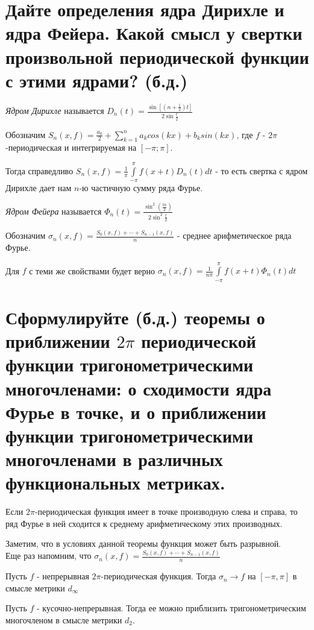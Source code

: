 \documentclass{article}
\begin{document}
	\section{Дайте определения ядра Дирихле и ядра Фейера. Какой смысл у свертки произвольной периодической функции с этими ядрами? (б.д.)}
	
	\begin{definition}
		\textit{Ядром Дирихле} называется $D_n(t)=\frac{\sin[(n+\frac{1}{2})t]}{2\sin{\frac{t}{2}}}$
	\end{definition}

	Обозначим $S_n(x,f)=\frac{a_0}{2} + \sum_{k=1}^{n} a_k cos(kx) + b_k sin(kx)$, где $f$ - $2\pi$-периодическая и интегрируемая на $[-\pi; \pi]$. 
	
	Тогда справедливо $S_n(x, f)=\frac{1}{\pi}\int\limits_{-\pi}^{\pi}f(x+t)D_n(t) dt$ - то есть свертка с ядром Дирихле дает нам $n$-ю частичную сумму ряда Фурье.

	\begin{definition}
		\textit{Ядром Фейера} называется $\Phi_n(t)=\frac{\sin^2(\frac{tn}{2})}{2\sin^2{\frac{t}{2}}}$
	\end{definition}

	Обозначим $\sigma_n(x,f)=\frac{S_0(x, f)+\cdots+S_{n-1}(x, f)}{n}$ - среднее арифметическое ряда Фурье. 
	
	Для $f$ с теми же свойствами будет верно $\sigma_n(x, f)=\frac{1}{n\pi}\int\limits_{-\pi}^{\pi}f(x+t)\Phi_n(t) dt$
	 
	\section{Сформулируйте (б.д.) теоремы о приближении $2\pi$ периодической функции тригонометрическими многочленами: о сходимости ядра Фурье в точке, и о приближении функции тригонометрическими многочленами в различных функциональных метриках.} 
	
	\begin{theorem} 
		Если $2\pi$-периодическая функция имеет в точке производную слева и справа, то ряд Фурье в ней сходится к среднему арифметическому этих производных.
	\end{theorem}

	Заметим, что в условиях данной теоремы функция может быть разрывной.\\
	
	Еще раз напомним, что $\sigma_n(x,f)=\frac{S_0(x, f)+\cdots+S_{n-1}(x, f)}{n}$
	
	\begin{theorem} 
		Пусть $f$ - непрерывная $2\pi$-периодическая функция. Тогда $\sigma_n \rightarrow f$ на $[-\pi, \pi]$ в смысле метрики $d_{\infty}$
	\end{theorem}

	\begin{theorem} 
		Пусть $f$ - кусочно-непрерывная. Тогда ее можно приблизить тригонометрическим многочленом в смысле метрики $d_2$.
	\end{theorem}
\end{document}
